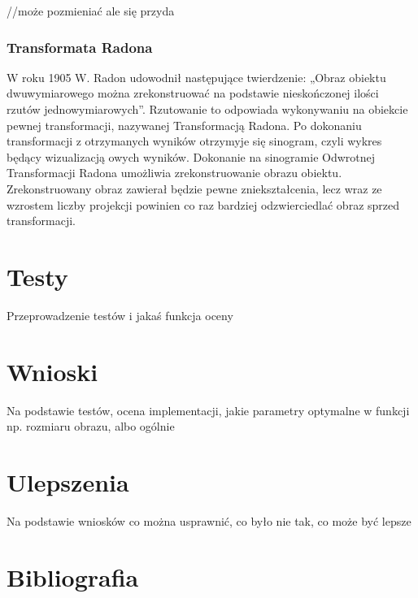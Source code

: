 \documentclass[A_4paper,12pt]{article}
\begin{document}
//może pozmieniać ale się przyda
\subsubsection{Transformata Radona}
W roku 1905 W. Radon udowodnił następujące twierdzenie: „Obraz obiektu dwuwymiarowego można zrekonstruować na podstawie nieskończonej ilości rzutów jednowymiarowych”. Rzutowanie to odpowiada wykonywaniu na obiekcie pewnej transformacji, nazywanej Transformacją Radona.
Po dokonaniu transformacji z otrzymanych wyników otrzymyje się sinogram, czyli wykres będący wizualizacją owych wyników.
Dokonanie na sinogramie Odwrotnej Transformacji Radona umożliwia zrekonstruowanie obrazu obiektu. Zrekonstruowany obraz zawierał będzie pewne zniekształcenia, lecz wraz ze wzrostem liczby projekcji powinien co raz bardziej odzwierciedlać obraz sprzed transformacji.


\section{Testy}
Przeprowadzenie testów i jakaś funkcja oceny

\section{Wnioski}
Na podstawie testów, ocena implementacji, jakie parametry optymalne w funkcji np. rozmiaru obrazu, albo ogólnie

\section{Ulepszenia}
Na podstawie wniosków co można usprawnić, co było nie tak, co może być lepsze

\section{Bibliografia}


\end{document}
